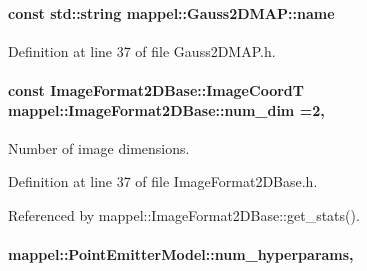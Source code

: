 \paragraph[{\texorpdfstring{name}{name}}]{\setlength{\rightskip}{0pt plus 5cm}const std\+::string mappel\+::\+Gauss2\+D\+M\+A\+P\+::name\hspace{0.3cm}{\ttfamily [static]}}\hypertarget{classmappel_1_1Gauss2DMAP_ab108b36b4172e55b3e53cefb645199a6}{}\label{classmappel_1_1Gauss2DMAP_ab108b36b4172e55b3e53cefb645199a6}


Definition at line 37 of file Gauss2\+D\+M\+A\+P.\+h.

\paragraph[{\texorpdfstring{num\+\_\+dim}{num_dim}}]{\setlength{\rightskip}{0pt plus 5cm}const {\bf Image\+Format2\+D\+Base\+::\+Image\+CoordT} mappel\+::\+Image\+Format2\+D\+Base\+::num\+\_\+dim =2\hspace{0.3cm}{\ttfamily [static]}, {\ttfamily [inherited]}}\hypertarget{classmappel_1_1ImageFormat2DBase_a9c29fcaf30faffc77b41ba556ebb0127}{}\label{classmappel_1_1ImageFormat2DBase_a9c29fcaf30faffc77b41ba556ebb0127}
Number of image dimensions. 

Definition at line 37 of file Image\+Format2\+D\+Base.\+h.



Referenced by mappel\+::\+Image\+Format2\+D\+Base\+::get\+\_\+stats().

\paragraph[{\texorpdfstring{num\+\_\+hyperparams}{num_hyperparams}}]{ mappel\+::\+Point\+Emitter\+Model\+::num\+\_\+hyperparams\hspace{0.3cm}{\ttfamily [protected]}, {\ttfamily [inherited]}}\hypertarget{classmappel_1_1PointEmitterModel_ab2423214fdd81c8212118770b5b17b1f}{}\label{classmappel_1_1PointEmitterModel_ab2423214fdd81c8212118770b5b17b1f}


